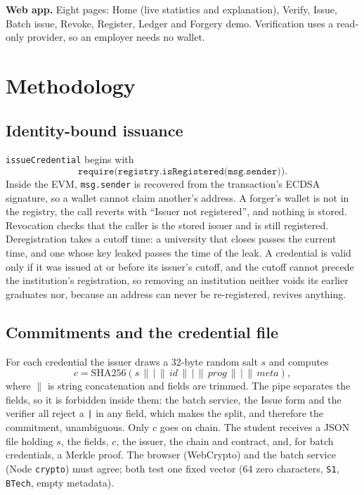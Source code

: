 \documentclass[10pt,twocolumn]{article}
\begin{document}
\textbf{Web app.} Eight pages: Home (live statistics and explanation), Verify, Issue, Batch issue, Revoke, Register, Ledger and Forgery demo. Verification uses a read-only provider, so an employer needs no wallet.

\section{Methodology}

\subsection{Identity-bound issuance}
\texttt{issueCredential} begins with
\[
\texttt{require(registry.isRegistered(msg.sender))}.
\]
Inside the EVM, \texttt{msg.sender} is recovered from the transaction's ECDSA signature, so a wallet cannot claim another's address. A forger's wallet is not in the registry, the call reverts with ``Issuer not registered'', and nothing is stored. Revocation checks that the caller is the stored issuer and is still registered. Deregistration takes a cutoff time: a university that closes passes the current time, and one whose key leaked passes the time of the leak. A credential is valid only if it was issued at or before its issuer's cutoff, and the cutoff cannot precede the institution's registration, so removing an institution neither voids its earlier graduates nor, because an address can never be re-registered, revives anything.

\subsection{Commitments and the credential file}
For each credential the issuer draws a 32-byte random salt $s$ and computes
\begin{equation}
c = \mathrm{SHA256}(s \,\|\, \texttt{|} \,\|\, \mathit{id} \,\|\, \texttt{|} \,\|\, \mathit{prog} \,\|\, \texttt{|} \,\|\, \mathit{meta}),
\end{equation}
where $\|$ is string concatenation and fields are trimmed. The pipe separates the fields, so it is forbidden inside them: the batch service, the Issue form and the verifier all reject a \texttt{|} in any field, which makes the split, and therefore the commitment, unambiguous. Only $c$ goes on chain. The student receives a JSON file holding $s$, the fields, $c$, the issuer, the chain and contract, and, for batch credentials, a Merkle proof. The browser (WebCrypto) and the batch service (Node \texttt{crypto}) must agree; both test one fixed vector (64 zero characters, \texttt{S1}, \texttt{BTech}, empty metadata).
\end{document}
